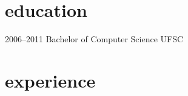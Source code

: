 \documentclass[]{friggeri-cv} %
\begin{document}
\section{education}

\begin{entrylist}
\entry
{2006--2011}
{Bachelor of Computer Science}
{UFSC}
{}
\end{entrylist}


\section{experience}
\end{document}
